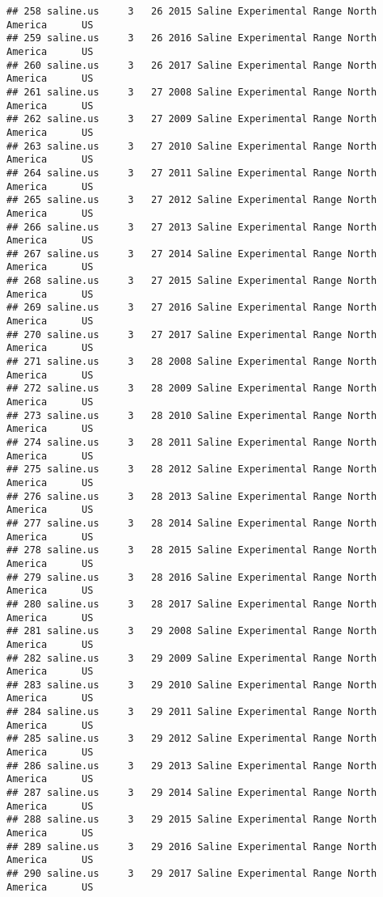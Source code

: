 \documentclass[]{article}
\begin{document}
\begin{verbatim}
## 258 saline.us     3   26 2015 Saline Experimental Range North America      US
## 259 saline.us     3   26 2016 Saline Experimental Range North America      US
## 260 saline.us     3   26 2017 Saline Experimental Range North America      US
## 261 saline.us     3   27 2008 Saline Experimental Range North America      US
## 262 saline.us     3   27 2009 Saline Experimental Range North America      US
## 263 saline.us     3   27 2010 Saline Experimental Range North America      US
## 264 saline.us     3   27 2011 Saline Experimental Range North America      US
## 265 saline.us     3   27 2012 Saline Experimental Range North America      US
## 266 saline.us     3   27 2013 Saline Experimental Range North America      US
## 267 saline.us     3   27 2014 Saline Experimental Range North America      US
## 268 saline.us     3   27 2015 Saline Experimental Range North America      US
## 269 saline.us     3   27 2016 Saline Experimental Range North America      US
## 270 saline.us     3   27 2017 Saline Experimental Range North America      US
## 271 saline.us     3   28 2008 Saline Experimental Range North America      US
## 272 saline.us     3   28 2009 Saline Experimental Range North America      US
## 273 saline.us     3   28 2010 Saline Experimental Range North America      US
## 274 saline.us     3   28 2011 Saline Experimental Range North America      US
## 275 saline.us     3   28 2012 Saline Experimental Range North America      US
## 276 saline.us     3   28 2013 Saline Experimental Range North America      US
## 277 saline.us     3   28 2014 Saline Experimental Range North America      US
## 278 saline.us     3   28 2015 Saline Experimental Range North America      US
## 279 saline.us     3   28 2016 Saline Experimental Range North America      US
## 280 saline.us     3   28 2017 Saline Experimental Range North America      US
## 281 saline.us     3   29 2008 Saline Experimental Range North America      US
## 282 saline.us     3   29 2009 Saline Experimental Range North America      US
## 283 saline.us     3   29 2010 Saline Experimental Range North America      US
## 284 saline.us     3   29 2011 Saline Experimental Range North America      US
## 285 saline.us     3   29 2012 Saline Experimental Range North America      US
## 286 saline.us     3   29 2013 Saline Experimental Range North America      US
## 287 saline.us     3   29 2014 Saline Experimental Range North America      US
## 288 saline.us     3   29 2015 Saline Experimental Range North America      US
## 289 saline.us     3   29 2016 Saline Experimental Range North America      US
## 290 saline.us     3   29 2017 Saline Experimental Range North America      US

\end{verbatim}
\end{document}
